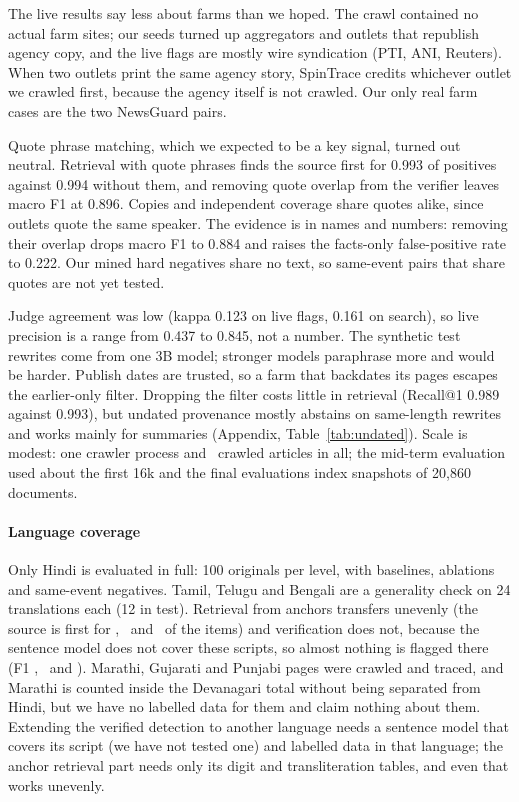 \documentclass[11pt,a4paper]{article}
\begin{document}
The live results say less about farms than we hoped. The crawl contained no actual farm sites; our seeds turned up aggregators and outlets that republish agency copy, and the live flags are mostly wire syndication (PTI, ANI, Reuters). When two outlets print the same agency story, SpinTrace credits whichever outlet we crawled first, because the agency itself is not crawled. Our only real farm cases are the two NewsGuard pairs.

Quote phrase matching, which we expected to be a key signal, turned out neutral. Retrieval with quote phrases finds the source first for 0.993 of positives against 0.994 without them, and removing quote overlap from the verifier leaves macro F1 at 0.896. Copies and independent coverage share quotes alike, since outlets quote the same speaker. The evidence is in names and numbers: removing their overlap drops macro F1 to 0.884 and raises the facts-only false-positive rate to 0.222. Our mined hard negatives share no text, so same-event pairs that share quotes are not yet tested.

Judge agreement was low (kappa 0.123 on live flags, 0.161 on search), so live precision is a range from 0.437 to 0.845, not a number. The synthetic test rewrites come from one 3B model; stronger models paraphrase more and would be harder. Publish dates are trusted, so a farm that backdates its pages escapes the earlier-only filter. Dropping the filter costs little in retrieval (Recall@1 0.989 against 0.993), but undated provenance mostly abstains on same-length rewrites and works mainly for summaries (Appendix, Table~\ref{tab:undated}). Scale is modest: one crawler process and \nStoreCrawl\ crawled articles in all; the mid-term evaluation used about the first 16k and the final evaluations index snapshots of 20{,}860 documents.

\paragraph{Language coverage} Only Hindi is evaluated in full: 100 originals per level, with baselines, ablations and same-event negatives. Tamil, Telugu and Bengali are a generality check on 24 translations each (12 in test). Retrieval from anchors transfers unevenly (the source is first for \nTaPone, \nTePone\ and \nBnPone\ of the items) and verification does not, because the sentence model does not cover these scripts, so almost nothing is flagged there (F1 \nTaF, \nTeF\ and \nBnF). Marathi, Gujarati and Punjabi pages were crawled and traced, and Marathi is counted inside the Devanagari total without being separated from Hindi, but we have no labelled data for them and claim nothing about them. Extending the verified detection to another language needs a sentence model that covers its script (we have not tested one) and labelled data in that language; the anchor retrieval part needs only its digit and transliteration tables, and even that works unevenly.
\end{document}
